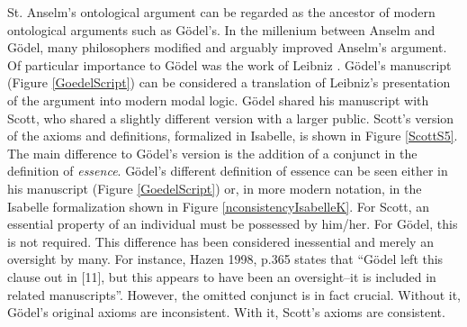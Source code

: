 \documentclass{article}
\begin{document}
St. Anselm's ontological argument \cite{Proslogion} can be regarded as the ancestor of modern ontological arguments such as G\"odel's. In the millenium between Anselm and G\"odel, many philosophers modified and arguably improved Anselm's argument. Of particular importance to G\"odel was the work of Leibniz \cite{ToDo}. 
G\"odel's manuscript (Figure \ref{GoedelScript}) can be considered a translation of Leibniz's presentation of the argument into modern modal logic. G\"odel shared his manuscript with Scott, who shared a slightly different version with a larger public. Scott's version of the axioms and definitions, formalized in Isabelle, is shown in Figure \ref{ScottS5}. The main difference to G\"odel's version is the addition of a conjunct in the definition of \emph{essence}. G\"odel's different definition of essence can be seen either in his manuscript (Figure \ref{GoedelScript}) or, in more modern notation, in the Isabelle formalization shown in Figure \ref{nconsistencyIsabelleK}. For Scott, an essential property of an individual must be possessed by him/her. For G\"odel, this is not required. This difference has been considered inessential and merely an oversight by many. For instance, Hazen 1998, p.365 \cite[p.365]{Hazen1998} states that ``G\"odel left this clause out in [11], but this appears to have been an oversight--it is included in related manuscripts''. However, the omitted conjunct is in fact crucial. Without it, G\"odel's original axioms are inconsistent. With it, Scott's axioms are consistent.


\end{document}
